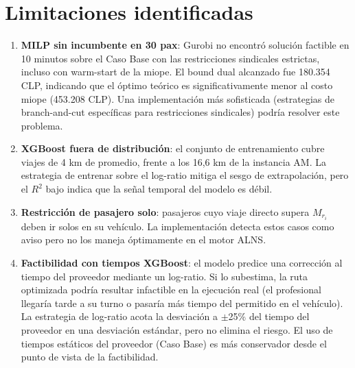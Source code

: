 \section{Limitaciones identificadas}

\begin{enumerate}
    \item \textbf{MILP sin incumbente en 30 pax}: Gurobi no encontró solución factible en 10 minutos sobre el Caso Base con las restricciones sindicales estrictas, incluso con warm-start de la miope. El bound dual alcanzado fue 180.354 CLP, indicando que el óptimo teórico es significativamente menor al costo miope (453.208 CLP). Una implementación más sofisticada (estrategias de branch-and-cut específicas para restricciones sindicales) podría resolver este problema.
    \item \textbf{XGBoost fuera de distribución}: el conjunto de entrenamiento cubre viajes de 4 km de promedio, frente a los 16,6 km de la instancia AM. La estrategia de entrenar sobre el log-ratio mitiga el sesgo de extrapolación, pero el $R^2$ bajo indica que la señal temporal del modelo es débil.
    \item \textbf{Restricción de pasajero solo}: pasajeros cuyo viaje directo supera $M_{r_i}$ deben ir solos en su vehículo. La implementación detecta estos casos como aviso pero no los maneja óptimamente en el motor ALNS.
    \item \textbf{Factibilidad con tiempos XGBoost}: el modelo predice una corrección al tiempo del proveedor mediante un log-ratio. Si lo subestima, la ruta optimizada podría resultar infactible en la ejecución real (el profesional llegaría tarde a su turno o pasaría más tiempo del permitido en el vehículo). La estrategia de log-ratio acota la desviación a $\pm$25\% del tiempo del proveedor en una desviación estándar, pero no elimina el riesgo. El uso de tiempos estáticos del proveedor (Caso Base) es más conservador desde el punto de vista de la factibilidad.
\end{enumerate}
